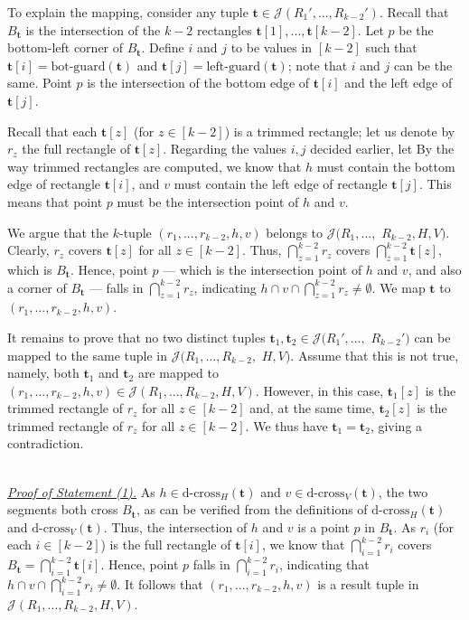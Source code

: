 \documentclass[sigconf]{acmart}
\def\vgap{\vspace{0mm}}
\def\extraspacing{\vspace{1.5mm} \noindent}
\def\J{\mathcal{J}}
\def\gleft{\mathrm{left\text{-}guard}}
\def\gbot{\mathrm{bot\text{-}guard}}
\def\dcross{\mathrm{d\text{-}cross}}
\begin{document}
{{{\vgap

To explain the mapping, consider any tuple $\bm{t} \in \J(R_1',...,R_{k-2}')$. Recall that $B_\bm{t}$ is the intersection of the $k-2$ rectangles $\bm{t}[1], ..., \bm{t}[k-2]$. Let $p$ be the bottom-left corner of $B_\bm{t}$. Define $i$ and $j$ to be values in $[k-2]$ such that $\bm{t}[i] = \gbot(\bm{t})$ and $\bm{t}[j] = \gleft(\bm{t})$; note that $i$ and $j$ can be the same. Point $p$ is the intersection of the bottom edge of $\bm{t}[i]$ and the left edge of $\bm{t}[j]$.

\vgap

Recall that each $\bm{t}[z]$ (for $z \in [k-2]$) is a trimmed rectangle; let us denote by $r_z$ the full rectangle of $\bm{t}[z]$. Regarding the values $i, j$ decided earlier, let
By the way trimmed rectangles are computed, we know that $h$ must contain the bottom edge of rectangle $\bm{t}[i]$, and $v$ must contain the left edge of rectangle $\bm{t}[j]$. This means that point $p$ must be the intersection point of $h$ and $v$.

\vgap

We argue that the $k$-tuple $(r_1, ..., r_{k-2}, h, v)$ belongs to $\J(R_1,...,$ $R_{k-2},H,V)$. Clearly, $r_z$ covers $\bm{t}[z]$ for all $z \in [k-2]$. Thus, $\bigcap_{z=1}^{k-2} r_z$ covers $\bigcap_{z=1}^{k-2} \bm{t}[z]$, which is $B_\bm{t}$. Hence, point $p$ --- which is the intersection point of $h$ and $v$, and also a corner of $B_\bm{t}$ --- falls in $\bigcap_{z=1}^{k-2} r_z$, indicating $h \cap v \cap \bigcap_{z=1}^{k-2} r_z \ne \emptyset$. We map $\bm{t}$ to $(r_1, ..., r_{k-2}, h, v)$.

\vgap

It remains to prove that no two distinct tuples $\bm{t}_1, \bm{t}_2 \in \J(R_1',...,$ $R_{k-2}')$ can be mapped to the same tuple in $\J(R_1,..., R_{k-2},$ $H, V)$. Assume that this is not true, namely, both $\bm{t}_1$ and $\bm{t}_2$ are mapped to $(r_1, ..., r_{k-2}, h, v) \in \J(R_1,..., R_{k-2}, H, V)$. However, in this case, $\bm{t}_1[z]$ is the trimmed rectangle of $r_z$ for all $z \in [k-2]$ and, at the same time, $\bm{t}_2[z]$ is the trimmed rectangle of $r_z$ for all $z \in [k-2]$. We thus have $\bm{t}_1 = \bm{t}_2$, giving a contradiction.

\extraspacing {\bf Proof of Lemma~\ref{lmm:hv:type1:properties}.} \\
\underline{\em Proof of Statement (1).} As $h \in \dcross_H(\bm{t})$ and $v \in \dcross_V(\bm{t})$, the two segments both cross $B_\bm{t}$, as can be verified from the definitions of $\dcross_H(\bm{t})$ and $\dcross_V(\bm{t})$. Thus, the intersection of $h$ and $v$ is a point $p$ in $B_\bm{t}$. As $r_i$ (for each $i \in [k-2]$) is the full rectangle of $\bm{t}[i]$, we know that $\bigcap_{i=1}^{k-2} r_i$ covers $B_\bm{t} = \bigcap_{i=1}^{k-2} \bm{t}[i]$. Hence, point $p$ falls in $\bigcap_{i=1}^{k-2} r_i$, indicating that $h\cap v \cap \bigcap_{i = 1}^{k-2}r_i \neq \emptyset$. It follows that $(r_1,...,r_{k-2},h,v)$ is a result tuple in $\J(R_1,...,R_{k-2},H,V)$.

}}}
\end{document}
